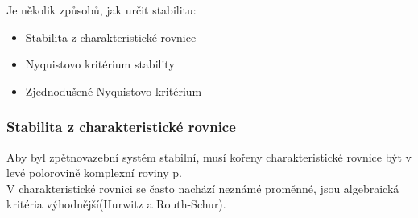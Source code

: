 Je několik způsobů, jak určit stabilitu:
\begin{itemize}
    \item Stabilita z charakteristické rovnice
    \item Nyquistovo kritérium stability
    \item Zjednodušené Nyquistovo kritérium
\end{itemize}


\subsubsection*{Stabilita z charakteristické rovnice}
Aby byl zpětnovazební systém stabilní, musí kořeny charakteristické rovnice být v levé polorovině komplexní roviny p.\\
V charakteristické rovnici se často nachází neznámé proměnné, jsou algebraická kritéria výhodnější(Hurwitz a Routh-Schur).\\

